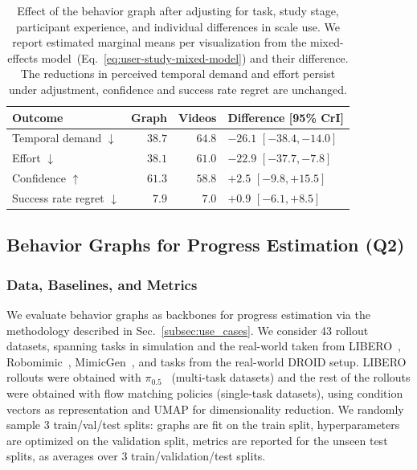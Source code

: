 \documentclass[letterpaper, 10 pt, conference]{ieeeconf}
\begin{document}
\begin{table}[t]
  \centering
  \caption{\small Effect of the behavior graph after adjusting for task, study stage, participant experience, and individual differences in scale use. We report estimated marginal means per visualization from the mixed-effects model~(Eq.~\ref{eq:user-study-mixed-model}) and their difference. The reductions in perceived temporal demand and effort persist under adjustment, confidence and success rate regret are unchanged.
  }
  \label{tab:study-adjusted}
  \small
  \begin{tabular}{@{}lrrl@{}}
  \toprule
  Outcome                      & Graph  & Videos & Difference [95\% CrI] \\
  \midrule
  Temporal demand $\downarrow$ & $38.7$ & $64.8$ & $-26.1$ $[-38.4, -14.0]$ \\
  Effort $\downarrow$          & $38.1$ & $61.0$ & $-22.9$ $[-37.7, -7.8]$ \\
  Confidence $\uparrow$        & $61.3$ & $58.8$ & $+2.5$ $[-9.8, +15.5]$ \\
  Success rate regret $\downarrow$ & $7.9$  & $7.0$  & $+0.9$ $[-6.1, +8.5]$ \\
  \bottomrule
  \end{tabular}
\end{table}


\subsection{Behavior Graphs for Progress Estimation (Q2)}

\subsubsection{Data, Baselines, and Metrics}

We evaluate behavior graphs as backbones for progress estimation via the methodology described in Sec.~\ref{subsec:use_cases}. We consider 43 rollout datasets, spanning tasks in simulation and the real-world taken from LIBERO~\cite{liu_libero_2023}, Robomimic~\cite{mandlekar_robomimic_2021}, MimicGen~\cite{mandlekar_mimicgen_2023}, and tasks from the real-world DROID setup. LIBERO rollouts were obtained with \(\pi_{0.5}\)~\cite{pi05_2025} (multi-task datasets) and the rest of the rollouts were obtained with flow matching policies (single-task datasets), using condition vectors as representation and UMAP for dimensionality reduction. We randomly sample 3 train/val/test splits: graphs are fit on the train split, hyperparameters are optimized on the validation split, metrics are reported for the unseen test splits, as averages over 3 train/validation/test splits.
\end{document}
